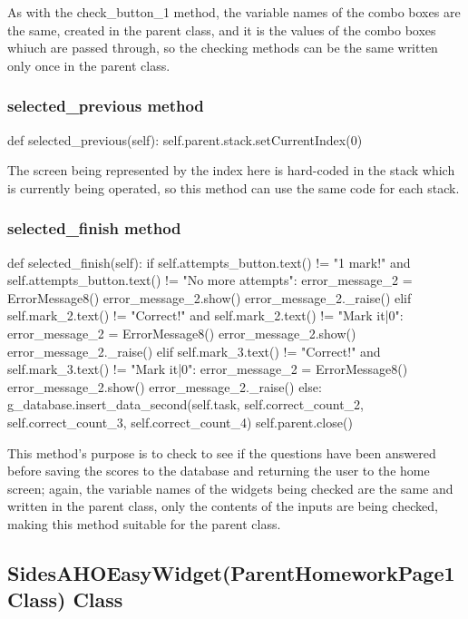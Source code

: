 As with the check\_button\_1 method, the variable names of the combo boxes are the same, created in the parent class, and it is the values of the combo boxes whiuch are passed through, so the checking methods can be the same written only once in the parent class.

\subsubsection{selected\_previous method}

\begin{python}
def selected_previous(self):
        self.parent.stack.setCurrentIndex(0)
\end{python}

The screen being represented by the index here is hard-coded in the stack which is currently being operated, so this method can use the same code for each stack.

\subsubsection{selected\_finish method}

\begin{python}
def selected_finish(self):
        if self.attempts_button.text() != "1 mark!" and self.attempts_button.text() != "No more attempts":
            error_message_2 = ErrorMessage8()
            error_message_2.show()
            error_message_2._raise()
        elif self.mark_2.text() != "Correct!" and self.mark_2.text() != "Mark it|0":
            error_message_2 = ErrorMessage8()
            error_message_2.show()
            error_message_2._raise()
        elif self.mark_3.text() != "Correct!" and self.mark_3.text() != "Mark it|0":
            error_message_2 = ErrorMessage8()
            error_message_2.show()
            error_message_2._raise()
        else:
            g_database.insert_data_second(self.task, self.correct_count_2, self.correct_count_3, self.correct_count_4)
            self.parent.close()
\end{python}

This method's purpose is to check to see if the questions have been answered before saving the scores to the database and returning the user to the home screen; again, the variable names of the widgets being checked are the same and written in the parent class, only the contents of the inputs are being checked, making this method suitable for the parent class.

\subsection{SidesAHOEasyWidget(ParentHomeworkPage1Class) Class}

